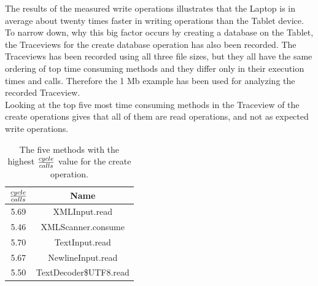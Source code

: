 The results of the measured write operations illustrates that the Laptop is in average about twenty times faster in writing operations than the Tablet device.
To narrow down, why this big factor occurs by creating a database on the Tablet, the Traceviews for the create database operation has also been recorded.
The Traceviews has been recorded using all three file sizes, but they all have the same ordering of top time consuming methods and they differ only in their execution times and calls.
Therefore the 1 Mb example has been used for analyzing the recorded Traceview.\\
Looking at the top five most time consuming methods in the Traceview of the create operations gives that all of them are read operations, and not as expected write operations.

\begin{table}[htpb]
	\centering
	\begin{tabular}{|c|c|}
		\hline
		${cycle \over calls}$&Name\\
		\hline
		5.69&XMLInput.read\\
		\hline
		5.46&XMLScanner.consume\\
		\hline
		5.70&TextInput.read\\
		\hline
		5.67&NewlineInput.read\\
		\hline
		5.50&TextDecoder\$UTF8.read\\
		\hline
	\end{tabular}
	\caption{The five methods with the highest ${cycle \over calls}$ value for the create operation.}
	\label{tab:top-five-cycle-call-write}
\end{table}

